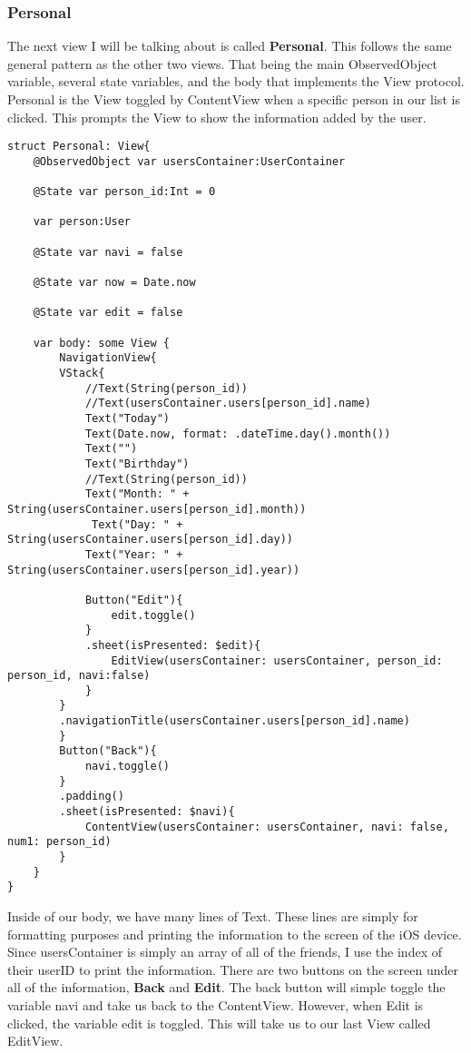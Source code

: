 \documentclass{article}
\theoremstyle{theorem}
\theoremstyle{definition}
\theoremstyle{remark}
\begin{document}
\subsubsection{Personal}

The next view I will be talking about is called \textbf{Personal}. This follows the same general pattern as the other two views. That being the main ObservedObject variable, several state variables, and the body that implements the View protocol. Personal is the View toggled by ContentView when a specific person in our list is clicked. This prompts the View to show the information added by the user.

\begin{verbatim}
struct Personal: View{
    @ObservedObject var usersContainer:UserContainer
    
    @State var person_id:Int = 0
    
    var person:User
    
    @State var navi = false
    
    @State var now = Date.now
    
    @State var edit = false

    var body: some View {
        NavigationView{
        VStack{
            //Text(String(person_id))
            //Text(usersContainer.users[person_id].name)
            Text("Today")
            Text(Date.now, format: .dateTime.day().month())
            Text("")
            Text("Birthday")
            //Text(String(person_id))
            Text("Month: " + String(usersContainer.users[person_id].month))
             Text("Day: " + String(usersContainer.users[person_id].day))
            Text("Year: " + String(usersContainer.users[person_id].year))
             
            Button("Edit"){
                edit.toggle()
            }
            .sheet(isPresented: $edit){
                EditView(usersContainer: usersContainer, person_id: person_id, navi:false)
            }
        }
        .navigationTitle(usersContainer.users[person_id].name)
        }
        Button("Back"){
            navi.toggle()
        }
        .padding()
        .sheet(isPresented: $navi){
            ContentView(usersContainer: usersContainer, navi: false, num1: person_id)
        }
    }
}
\end{verbatim}

\noindent\newline Inside of our body, we have many lines of Text. These lines are simply for formatting purposes and printing the information to the screen of the iOS device. Since usersContainer is simply an array of all of the friends, I use the index of their userID to print the information. There are two buttons on the screen under all of the information, \textbf{Back} and \textbf{Edit}. The back button will simple toggle the variable navi and take us back to the ContentView. However, when Edit is clicked, the variable edit is toggled. This will take us to our last View called EditView.
\end{document}
